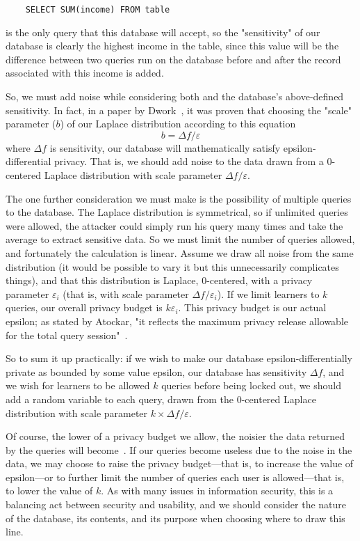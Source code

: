 \documentclass[conference,11pt]{IEEEtran}
\begin{document}
\begin{verbatim}
    SELECT SUM(income) FROM table
\end{verbatim}
is the only query that this database will accept, so the "sensitivity" of our
database is clearly the highest income in the table, since this value will be
the difference between two queries run on the database before and after the
record associated with this income is added.

So, we must add noise while considering both {\textepsilon} and the database's
above-defined sensitivity. In fact, in a paper by Dwork~\cite{Dwork:2011}, it
was proven that choosing the "scale" parameter ($b$) of our Laplace distribution
according to this equation
\begin{equation}
    b = {\Delta}f/\varepsilon
\end{equation}
where ${\Delta}f$ is sensitivity, our database will mathematically satisfy
epsilon-differential privacy. That is, we should add noise to the data drawn
from a 0-centered Laplace distribution with scale parameter
${\Delta}f/\varepsilon$.

The one further consideration we must make is the possibility of multiple
queries to the database. The Laplace distribution is symmetrical, so if
unlimited queries were allowed, the attacker could simply run his query many
times and take the average to extract sensitive data. So we must limit the
number of queries allowed, and fortunately the calculation is linear. Assume we
draw all noise from the same distribution (it would be possible to vary it but
this unnecessarily complicates things), and that this distribution is Laplace,
0-centered, with a privacy parameter $\varepsilon_i$ (that is, with scale
parameter ${\Delta}f/\varepsilon_i$). If we limit learners to $k$ queries, our
overall privacy budget is $k\varepsilon_i$. This privacy budget is our
actual epsilon; as stated by Atockar, "it reflects the maximum privacy release
allowable for the total query session"~\cite{Atockar:2014}.

So to sum it up practically: if we wish to make our database
epsilon-differentially private as bounded by some value epsilon, our database
has sensitivity ${\Delta}f$, and we wish for learners to be allowed $k$ queries
before being locked out, we should add a random variable to each query, drawn
from the 0-centered Laplace distribution with scale parameter $k \times
{\Delta}f/\varepsilon$.

Of course, the lower of a privacy budget we allow, the noisier the data returned
by the queries will become~\cite{Atockar:2014}. If our queries become useless
due to the noise in the data, we may choose to raise the privacy budget---that
is, to increase the value of epsilon---or to further limit the number of queries
each user is allowed---that is, to lower the value of $k$. As with many issues
in information security, this is a balancing act between security and usability,
and we should consider the nature of the database, its contents, and its purpose
when choosing where to draw this line.
\end{document}
